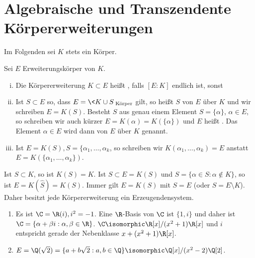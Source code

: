 \section{Algebraische und Transzendente Körpererweiterungen}


Im Folgenden sei $K$ stets ein Körper.

\begin{df} \label{dup:18.3-1}
	Sei $E$ Erweiterungskörper von $K$.
	\begin{enumerate}[i)]
		\item
			Die Körpererweiterung $K \subset E$ heißt , falls $[E : K]$ endlich ist, sonst 
		\item
			Ist $S \subset E$ so, dass $E = \<K \cup S\>_{\text{Körper}}$ gilt, so heißt $S$  von $E$ über $K$ und wir schreiben $E = K(S)$.
			Besteht $S$ aus genau einem Element $S = \{ \alpha \}$, $\alpha \in E$, so schreiben wir auch kürzer $E = K(\alpha) = K(\{\alpha\})$ und $E$ heißt .
			Das Element $\alpha \in E$ wird dann  von $E$ über $K$ genannt.
		\item
			Ist $E = K(S), S = \{\alpha_1, \dotsc, \alpha_k$, so schreiben wir $K(\alpha_1, \dotsc, \alpha_k) = E$ anstatt $E = K(\{\alpha_1, \dotsc, \alpha_k\})$.
	\end{enumerate}
\end{df}

\begin{note}
	Ist $S \subset K$, so ist $K(S) = K$.
	Ist $S \subset E = K(S)$ und $\hat S = \{ \alpha \in S : \alpha \not\in K\}$, so ist $E = K(\hat S) = K(S)$.
	Immer gilt $E = K(S)$ mit $S = E$ (oder $S = E \setminus K$).
	Daher besitzt jede Körpererweiterung ein Erzeugendensystem.
\end{note}

\begin{ex*}
	\begin{enumerate}[1.)]
		\item
			Es ist $\C = \R(i), i^2 = -1$.
			Eine $\R$-Basis von $\C$ ist $\{1, i\}$ und daher ist $\C = \{ \alpha + \beta i : \alpha, \beta \in \R\}$.
			$\C \isomorphic \R[x] / (x^2+1) \R[x]$ und $i$ entspricht gerade der Nebenklasse $x + (x^2+1)\R[x]$.
		\item
			$E = \Q(\sqrt 2) = \{ a + b \sqrt 2 : a,b \in \Q \} \isomorphic \Q[x] / (x^2 - 2) \Q[2]$.
	\end{enumerate}
\end{ex*}

